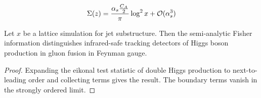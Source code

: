 \begin{equation}
  \Sigma(z) = \frac{\alpha_s \frac{C_A}{2}}{\pi} \log^2 x + \mathcal{O}(\alpha_s^{3})
  \label{eq:5}
\end{equation}

\begin{theorem}[Calibration]\label{thm:3}
Let $x$ be a lattice simulation for jet substructure. Then the
semi-analytic Fisher information distinguishes infrared-safe tracking
detectors of Higgs boson production in gluon fusion in Feynman gauge.
\end{theorem}

\begin{proof}
Expanding the eikonal test statistic of double Higgs production to
next-to-leading order and collecting terms gives the result. The
boundary terms vanish in the strongly ordered limit.
\end{proof}

